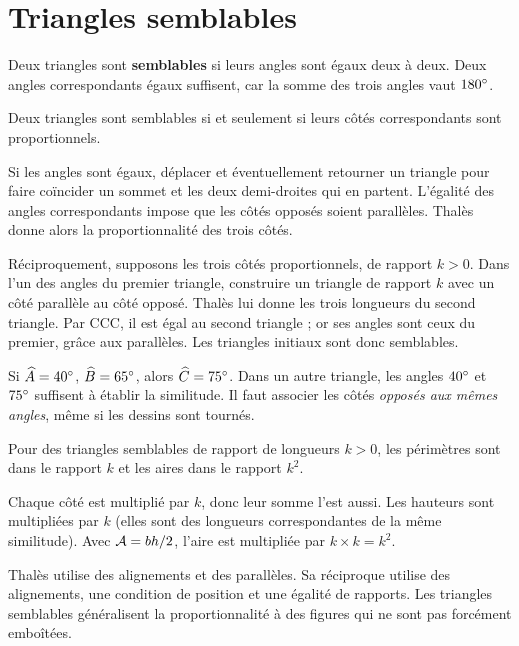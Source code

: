 \documentclass[../cours_3e.tex]{subfiles}
\begin{document}
\section{Triangles semblables}
\begin{definition}
Deux triangles sont \textbf{semblables} si leurs angles sont égaux deux à deux. Deux angles correspondants égaux suffisent, car la somme des trois angles vaut $180^{\circ}$.
\end{definition}
\begin{theoreme}
Deux triangles sont semblables si et seulement si leurs côtés correspondants sont proportionnels.
\end{theoreme}
\begin{demonstration}
Si les angles sont égaux, déplacer et éventuellement retourner un triangle pour faire coïncider un sommet et les deux demi-droites qui en partent. L'égalité des angles correspondants impose que les côtés opposés soient parallèles. Thalès donne alors la proportionnalité des trois côtés.

Réciproquement, supposons les trois côtés proportionnels, de rapport $k>0$. Dans l'un des angles du premier triangle, construire un triangle de rapport $k$ avec un côté parallèle au côté opposé. Thalès lui donne les trois longueurs du second triangle. Par CCC, il est égal au second triangle ; or ses angles sont ceux du premier, grâce aux parallèles. Les triangles initiaux sont donc semblables.
\end{demonstration}
\begin{exemple}
Si $\widehat A=40^{\circ}$, $\widehat B=65^{\circ}$, alors $\widehat C=75^{\circ}$. Dans un autre triangle, les angles $40^{\circ}$ et $75^{\circ}$ suffisent à établir la similitude. Il faut associer les côtés \emph{opposés aux mêmes angles}, même si les dessins sont tournés.
\end{exemple}
\begin{propriete}
Pour des triangles semblables de rapport de longueurs $k>0$, les périmètres sont dans le rapport $k$ et les aires dans le rapport $k^2$.
\end{propriete}
\begin{demonstration}
Chaque côté est multiplié par $k$, donc leur somme l'est aussi. Les hauteurs sont multipliées par $k$ (elles sont des longueurs correspondantes de la même similitude). Avec $\mathcal{A}=bh/2$, l'aire est multipliée par $k\times k=k^2$.
\end{demonstration}
\begin{retenir}
Thalès utilise des alignements et des parallèles. Sa réciproque utilise des alignements, une condition de position et une égalité de rapports. Les triangles semblables généralisent la proportionnalité à des figures qui ne sont pas forcément emboîtées.
\end{retenir}
\end{document}
